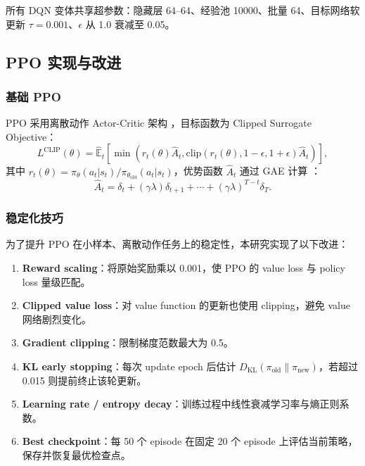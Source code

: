 \documentclass{article}
\begin{document}
所有 DQN 变体共享超参数：隐藏层 64--64、经验池 10000、批量 64、目标网络软更新 $\tau=0.001$、$\epsilon$ 从 1.0 衰减至 0.05。

\subsection{PPO 实现与改进}

\subsubsection{基础 PPO}

PPO 采用离散动作 Actor-Critic 架构 \citep{schulman2017proximal}，目标函数为 Clipped Surrogate Objective：
\begin{equation}
  L^{\text{CLIP}}(\theta) = \hat{\mathbb{E}}_t\left[\min\left(r_t(\theta)\hat{A}_t, \text{clip}(r_t(\theta),1-\epsilon,1+\epsilon)\hat{A}_t\right)\right],
\end{equation}
其中 $r_t(\theta)=\pi_\theta(a_t|s_t)/\pi_{\theta_{\text{old}}}(a_t|s_t)$，优势函数 $\hat{A}_t$ 通过 GAE 计算 \citep{schulman2015high}：
\begin{equation}
  \hat{A}_t = \delta_t + (\gamma\lambda)\delta_{t+1} + \cdots + (\gamma\lambda)^{T-t}\delta_T.
\end{equation}

\subsubsection{稳定化技巧}

为了提升 PPO 在小样本、离散动作任务上的稳定性，本研究实现了以下改进：
\begin{enumerate}[label=(\arabic*)]
  \item \textbf{Reward scaling}：将原始奖励乘以 0.001，使 PPO 的 value loss 与 policy loss 量级匹配。
  \item \textbf{Clipped value loss}：对 value function 的更新也使用 clipping，避免 value 网络剧烈变化。
  \item \textbf{Gradient clipping}：限制梯度范数最大为 0.5。
  \item \textbf{KL early stopping}：每次 update epoch 后估计 $D_{\text{KL}}(\pi_{\text{old}}\|\pi_{\text{new}})$，若超过 0.015 则提前终止该轮更新。
  \item \textbf{Learning rate / entropy decay}：训练过程中线性衰减学习率与熵正则系数。
  \item \textbf{Best checkpoint}：每 50 个 episode 在固定 20 个 episode 上评估当前策略，保存并恢复最优检查点。
\end{enumerate}
\end{document}
